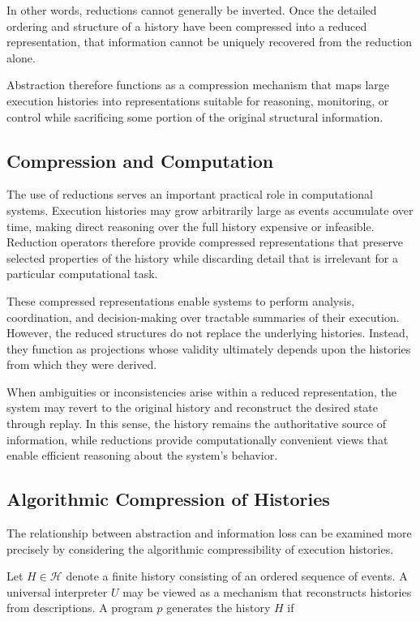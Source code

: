 \documentclass[12pt]{article}
\begin{document}
In other words, reductions cannot generally be inverted.
Once the detailed ordering and structure of a history
have been compressed into a reduced representation,
that information cannot be uniquely recovered from the
reduction alone.

Abstraction therefore functions as a compression
mechanism that maps large execution histories into
representations suitable for reasoning, monitoring,
or control while sacrificing some portion of the
original structural information.

\subsection{Compression and Computation}

The use of reductions serves an important practical
role in computational systems. Execution histories may
grow arbitrarily large as events accumulate over time,
making direct reasoning over the full history expensive
or infeasible. Reduction operators therefore provide
compressed representations that preserve selected
properties of the history while discarding detail
that is irrelevant for a particular computational
task.

These compressed representations enable systems to
perform analysis, coordination, and decision-making
over tractable summaries of their execution. However,
the reduced structures do not replace the underlying
histories. Instead, they function as projections whose
validity ultimately depends upon the histories from
which they were derived.

When ambiguities or inconsistencies arise within a
reduced representation, the system may revert to the
original history and reconstruct the desired state
through replay. In this sense, the history remains the
authoritative source of information, while reductions
provide computationally convenient views that enable
efficient reasoning about the system's behavior.

\subsection{Algorithmic Compression of Histories}

The relationship between abstraction and information loss
can be examined more precisely by considering the
algorithmic compressibility of execution histories.

Let $H \in \mathcal{H}$ denote a finite history consisting
of an ordered sequence of events. A universal interpreter
$U$ may be viewed as a mechanism that reconstructs histories
from descriptions. A program $p$ generates the history $H$
if
\end{document}
